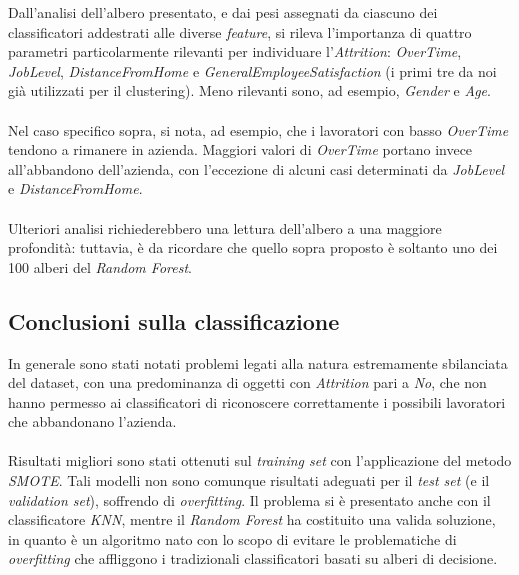 \noindent Dall’analisi dell’albero presentato, e dai pesi assegnati da ciascuno dei classificatori addestrati alle diverse \textit{\textit{feature}}, si rileva l’importanza di quattro parametri particolarmente rilevanti per individuare l'\textit{Attrition}: \textit{OverTime}, \textit{JobLevel}, \textit{DistanceFromHome} e \textit{GeneralEmployeeSatisfaction} (i primi tre da noi già utilizzati per il clustering). Meno rilevanti sono, ad esempio, \textit{Gender} e \textit{Age}. 
\\\\Nel caso specifico sopra, si nota, ad esempio, che i lavoratori con basso \textit{OverTime} tendono a rimanere in azienda. Maggiori valori di \textit{OverTime} portano invece all’abbandono dell’azienda, con l’eccezione di alcuni casi determinati da \textit{JobLevel} e \textit{DistanceFromHome}.
\\\\Ulteriori analisi richiederebbero una lettura dell’albero a una maggiore profondità: tuttavia, è da ricordare che quello sopra proposto è soltanto uno dei 100 alberi del \textit{Random Forest}.
\subsection{Conclusioni sulla classificazione}
In generale sono stati notati problemi legati alla natura estremamente sbilanciata del dataset, con una predominanza di oggetti con \textit{Attrition} pari a \textit{No}, che non hanno permesso ai classificatori di riconoscere correttamente i possibili lavoratori che abbandonano l’azienda. \\\\Risultati migliori sono stati ottenuti sul \textit{training set} con l’applicazione del metodo \textit{SMOTE}. Tali modelli non sono comunque risultati adeguati per il \textit{test set} (e il \textit{validation set}), soffrendo di \textit{overfitting}. Il problema si è presentato anche con il classificatore \textit{KNN}, mentre il \textit{Random Forest} ha costituito una valida soluzione, in quanto è un algoritmo nato con lo scopo di evitare le problematiche di \textit{overfitting} che affliggono i tradizionali classificatori basati su alberi di decisione. %

